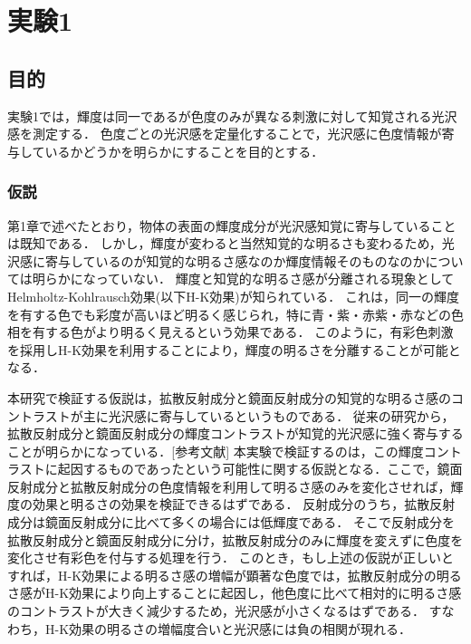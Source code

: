 \chapter{実験1}

\section{目的}

    実験1では，輝度は同一であるが色度のみが異なる刺激に対して知覚される光沢感を測定する．
    色度ごとの光沢感を定量化することで，光沢感に色度情報が寄与しているかどうかを明らかにすることを目的とする．

    \subsection{仮説}

        第1章で述べたとおり，物体の表面の輝度成分が光沢感知覚に寄与していることは既知である．
        しかし，輝度が変わると当然知覚的な明るさも変わるため，光沢感に寄与しているのが知覚的な明るさ感なのか輝度情報そのものなのかについては明らかになっていない．
        輝度と知覚的な明るさ感が分離される現象としてHelmholtz-Kohlrausch効果(以下H-K効果)が知られている．
        これは，同一の輝度を有する色でも彩度が高いほど明るく感じられ，特に青・紫・赤紫・赤などの色相を有する色がより明るく見えるという効果である．
        このように，有彩色刺激を採用しH-K効果を利用することにより，輝度の明るさを分離することが可能となる．

        本研究で検証する仮説は，拡散反射成分と鏡面反射成分の知覚的な明るさ感のコントラストが主に光沢感に寄与しているというものである．
        従来の研究から，拡散反射成分と鏡面反射成分の輝度コントラストが知覚的光沢感に強く寄与することが明らかになっている．[参考文献]
        本実験で検証するのは，この輝度コントラストに起因するものであったという可能性に関する仮説となる．ここで，鏡面反射成分と拡散反射成分の色度情報を利用して明るさ感のみを変化させれば，輝度の効果と明るさの効果を検証できるはずである．
        反射成分のうち，拡散反射成分は鏡面反射成分に比べて多くの場合には低輝度である．
        そこで反射成分を拡散反射成分と鏡面反射成分に分け，拡散反射成分のみに輝度を変えずに色度を変化させ有彩色を付与する処理を行う．
        このとき，もし上述の仮説が正しいとすれば，H-K効果による明るさ感の増幅が顕著な色度では，拡散反射成分の明るさ感がH-K効果により向上することに起因し，他色度に比べて相対的に明るさ感のコントラストが大きく減少するため，光沢感が小さくなるはずである．
        すなわち，H-K効果の明るさの増幅度合いと光沢感には負の相関が現れる．

